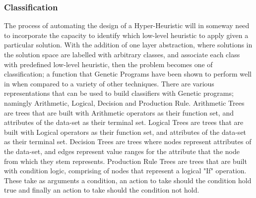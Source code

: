\documentclass[a4paper,12pt]{article}
\begin{document}
        \subsubsection{Classification}
            \par{The process of automating the design of a Hyper-Heuristic will in someway need to incorporate the capacity to identify which low-level heuristic to apply given a particular solution. With the addition of one layer abstraction, where solutions in the solution space are labelled with arbitrary classes, and associate each class with predefined low-level heuristic, then the problem becomes one of classification; a function that Genetic Programs have been shown to perform well in when compared to a variety of other techniques\cite{sagoc}.\newline
            \newline
            There are various representations that can be used to build classifiers with Genetic programs; namingly Arithmetic, Logical, Decision and Production Rule.\newline
            \newline
            Arithmetic Trees are trees that are built with Arithmetic operators as their function set, and attributes of the data-set as their terminal set.\newline
            \newline
            Logical Trees are trees that are built with Logical operators as their function set, and attributes of the data-set as their terminal set.\newline
            \newline
            Decision Trees are trees where nodes represent attributes of the data-set, and edges represent value ranges for the attribute that the node from which they stem represents.\newline
            \newline
            Production Rule Trees are trees that are built with condition logic, comprising of nodes that represent a logical "If" operation. These take as arguments a condition, an action to take should the condition hold true and finally an action to take should the condition not hold.
            } 
\end{document}
